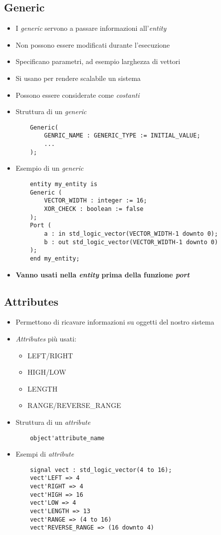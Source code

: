 \documentclass{article}
\begin{document}
\subsection{Generic}
\begin{itemize}
	\item I \textit{generic} servono a passare informazioni all'\textit{entity}
	\item Non possono essere modificati durante l'esecuzione
	\item Specificano parametri, ad esempio larghezza di vettori
	\item Si usano per rendere scalabile un sistema
	\item Possono essere considerate come \textit{costanti}
	\item Struttura di un \textit{generic}
	      \begin{verbatim}
    Generic(
        GENRIC_NAME : GENERIC_TYPE := INITIAL_VALUE;
        ...
    );
	      \end{verbatim}
	\item Esempio di un \textit{generic}
	      \begin{verbatim}
    entity my_entity is
    Generic (
        VECTOR_WIDTH : integer := 16;
        XOR_CHECK : boolean := false
    );
    Port (
        a : in std_logic_vector(VECTOR_WIDTH-1 downto 0);
        b : out std_logic_vector(VECTOR_WIDTH-1 downto 0)
    );
    end my_entity;
	      \end{verbatim}
	\item \textbf{Vanno usati nella \textit{entity} prima della funzione \textit{port}}
\end{itemize}

\subsection{Attributes}
\begin{itemize}
	\item Permettono di ricavare informazioni su oggetti del nostro sistema
	\item \textit{Attributes} più usati:
	      \begin{itemize}
	      	\item LEFT/RIGHT
	      	\item HIGH/LOW
	      	\item LENGTH
	      	\item RANGE/REVERSE\_RANGE
	      \end{itemize}
	\item Struttura di un \textit{attribute}
	      \begin{verbatim}
    object'attribute_name
	      \end{verbatim}
	\newpage
	\item Esempi di \textit{attribute}
	      \begin{verbatim}
    signal vect : std_logic_vector(4 to 16);
    vect'LEFT => 4
    vect'RIGHT => 4
    vect'HIGH => 16
    vect'LOW => 4
    vect'LENGTH => 13
    vect'RANGE => (4 to 16)
    vect'REVERSE_RANGE => (16 downto 4)
	      \end{verbatim}
\end{itemize}
\end{document}
